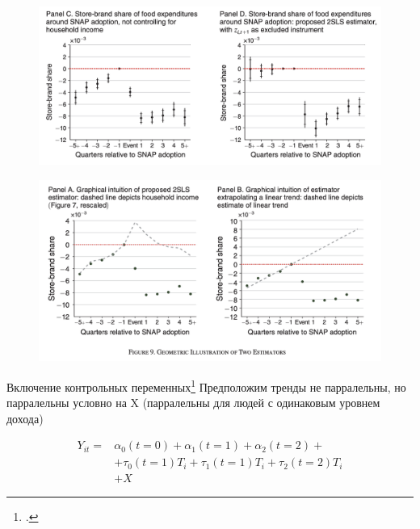 \begin{frame}{\textcite{hastings2018snap}}

\begin{figure}
    \centering
    \includegraphics[width=\textwidth]{Images/did_controls.png}
\end{figure}


\end{frame}



\begin{frame}{}

\begin{figure}
    \centering
    \includegraphics[width=\textwidth]{Images/linear_or_confounder.png}
\end{figure}

\end{frame}

\begin{frame}{Включение контрольных переменных\footcitetext[Раздел 5.2, 5.2]{angrist2008mostly}}
Предположим тренды не парралельны, но парралельны условно на X (парралельны для людей с одинаковым уровнем дохода)

\begin{align*}
    Y_{it} = & \alpha_0 (t=0) + \alpha_1  (t=1) + \alpha_2 (t=2) + \\
     &+ \tau_0 (t=1) T_{i} + \tau_1 (t=1) T_{i} + \tau_2 (t=2) T_{i} \\
     &+ X
\end{align*}

    
\end{frame}


